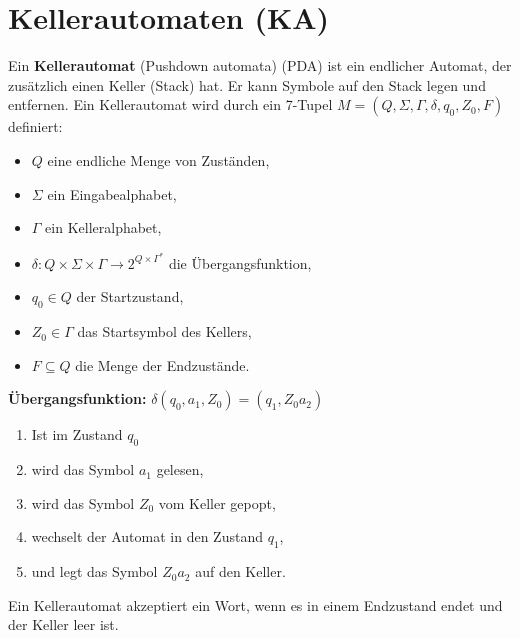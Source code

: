 \documentclass{article}
\begin{document}
\section*{Kellerautomaten (KA)}
\begin{minipage}[t]{0.45\textwidth}
    Ein \textbf{Kellerautomat} (Pushdown automata) (PDA) ist ein endlicher Automat, der zusätzlich einen Keller (Stack) hat. 
    Er kann Symbole auf den Stack legen und entfernen. Ein Kellerautomat wird durch ein 7-Tupel $M = (Q, \Sigma, \Gamma, \delta, q_0, Z_0, F)$ definiert:
    \begin{itemize}
        \item $Q$ eine endliche Menge von Zuständen,
        \item $\Sigma$ ein Eingabealphabet,
        \item $\Gamma$ ein Kelleralphabet,
        \item $\delta: Q \times \Sigma \times \Gamma \to 2^{Q \times \Gamma^*}$ die Übergangsfunktion,
        \item $q_0 \in Q$ der Startzustand,
        \item $Z_0 \in \Gamma$ das Startsymbol des Kellers,
        \item $F \subseteq Q$ die Menge der Endzustände.
    \end{itemize}
    \textbf{Übergangsfunktion:} $\delta(q_0, a_1, Z_0) = (q_1, Z_0 a_2)$
    \begin{enumerate}
        \item Ist im Zustand $q_0$ 
        \item wird das Symbol $a_1$ gelesen,
        \item wird das Symbol $Z_0$ vom Keller gepopt,
        \item wechselt der Automat in den Zustand $q_1$,
        \item und legt das Symbol $Z_0 a_2$ auf den Keller.
    \end{enumerate}
    
    Ein Kellerautomat akzeptiert ein Wort, wenn es in einem Endzustand endet und der Keller leer ist.
\end{minipage}
\hfill
\end{document}
